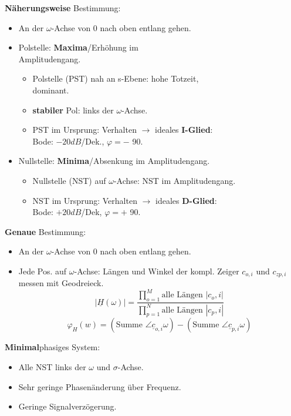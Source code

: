 \textbf{Näherungsweise} Bestimmung:
\begin{itemize}
\item An der $\omega$-Achse von 0 nach oben entlang gehen.
\item Polstelle: \textbf{Maxima}/Erhöhung im\\ Amplitudengang.
\begin{itemize}
	\item Polstelle (PST) nah an s-Ebene: hohe Totzeit, \\dominant.
	\item \textbf{stabiler} Pol: links der $\omega$-Achse.
	\item PST im Ursprung: Verhalten $\rightarrow$ ideales \textbf{I-Glied}:\\ Bode: $-20dB$/Dek., $\varphi=-$ 90\textdegree.
\end{itemize}
\item Nullstelle: \textbf{Minima}/Absenkung im Amplitudengang.
\begin{itemize}
	\item Nullstelle (NST) auf $\omega$-Achse: NST im Amplitudengang.
	\item NST im Ursprung: Verhalten $\rightarrow$ ideales \textbf{D-Glied}:\\ Bode: $+20dB$/Dek, $ \varphi=+$ 90\textdegree.
\end{itemize}

\end{itemize}
\textbf{Genaue} Bestimmung:
\begin{itemize}
	\item An der $\omega$-Achse von 0 nach oben entlang gehen.
	\item Jede Pos. auf $\omega$-Achse: Längen und Winkel der kompl. Zeiger $c_{o,i}$ und $c_{zp,i}$ messen mit Geodreieck.
	\[
	|\underline{H}(\omega)|=\frac{\prod_{o=1}^{M}\text{alle Längen } |c_o,i|}{\prod_{p=1}^{N}\text{alle Längen } |c_p,i|}
	\]
	\[
	\varphi_H(w)=(\text{Summe } \angle \underline{c}_{o,i}{\omega})-(\text{Summe } \angle \underline{c}_{p,i}{\omega})
	\]
\end{itemize}
\textbf{Minimal}phasiges System:
\begin{itemize}
	\item Alle NST links der $\omega$ und $\sigma$-Achse.
	\item Sehr geringe Phasen\"anderung \"uber Frequenz.
	\item Geringe Signalverz\"ogerung.
\end{itemize}

